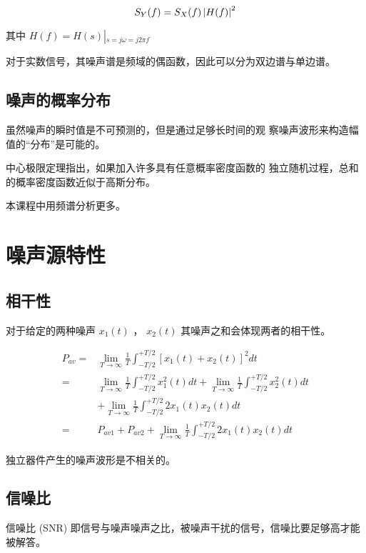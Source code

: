 \documentclass[cn,11pt,chinese,black,simple]{../elegantbook}
\begin{document}
\[S_Y(f) = S_X(f) \left| H(f) \right|^2\] 

其中 \(H(f) = H(s)\left|_{s = j\omega = j 2 \pi f}\right.\)

对于实数信号，其噪声谱是频域的偶函数，因此可以分为双边谱与单边谱。

\subsection{噪声的概率分布}

虽然噪声的瞬时值是不可预测的，但是通过足够长时间的观
察噪声波形来构造幅值的“分布”是可能的。

中心极限定理指出，如果加入许多具有任意概率密度函数的
独立随机过程，总和的概率密度函数近似于高斯分布。

本课程中用频谱分析更多。

\section{噪声源特性}

\subsection{相干性}

对于给定的两种噪声 \(x_1(t)\) ， \(x_2(t)\) 其噪声之和会体现两者的相干性。

\[\begin{aligned}
    P_{a v}=& \lim _{T \rightarrow \infty} \frac{1}{T} \int_{-T / 2}^{+T / 2}\left[x_{1}(t)+x_{2}(t)\right]^{2} d t \\
    =& \lim _{T \rightarrow \infty} \frac{1}{T} \int_{-T / 2}^{+T / 2} x_{1}^{2}(t) d t+\lim _{T \rightarrow \infty} \frac{1}{T} \int_{-T / 2}^{+T / 2} x_{2}^{2}(t) d t \\
    &+\lim _{T \rightarrow \infty} \frac{1}{T} \int_{-T / 2}^{+T / 2} 2 x_{1}(t) x_{2}(t) d t \\
    =& P_{a v 1}+P_{a v 2}+\lim _{T \rightarrow \infty} \frac{1}{T} \int_{-T / 2}^{+T / 2} 2 x_{1}(t) x_{2}(t) d t
\end{aligned}\]

独立器件产生的噪声波形是不相关的。

\subsection{信噪比}

信噪比 (SNR) 即信号与噪声噪声之比，被噪声干扰的信号，信噪比要足够高才能被解答。
\end{document}
